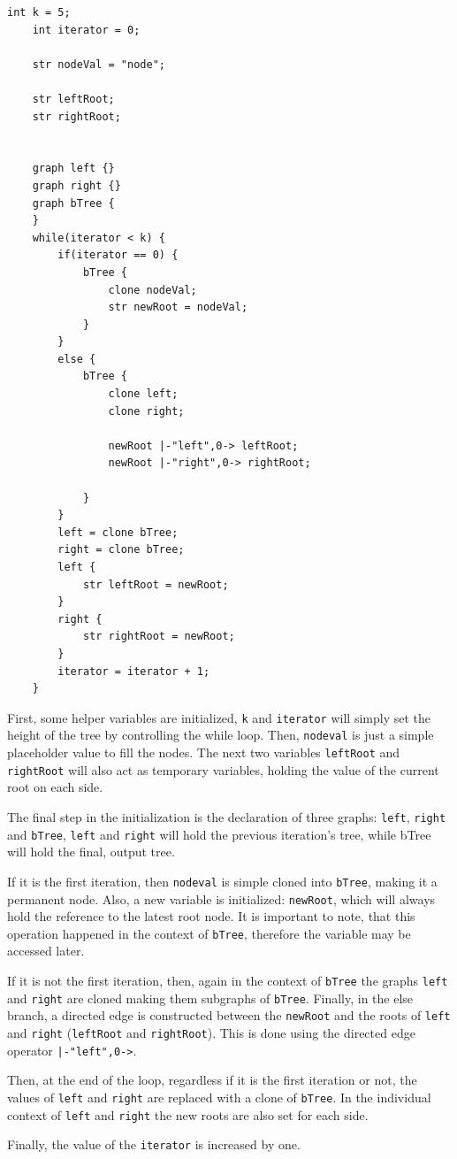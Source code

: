 \begin{lstlisting}[caption={Lattice code generating a balanced binary tree of height K.},captionpos=b,label={lst:syntax_k_sized_tree}]
    int k = 5;
    int iterator = 0;

    str nodeVal = "node";

    str leftRoot;
    str rightRoot;


    graph left {}
    graph right {}
    graph bTree {
    }
    while(iterator < k) {
        if(iterator == 0) {
            bTree {
                clone nodeVal;
                str newRoot = nodeVal;
            }
        }
        else {
            bTree {
                clone left;
                clone right;

                newRoot |-"left",0-> leftRoot;
                newRoot |-"right",0-> rightRoot;

            }
        }
        left = clone bTree;
        right = clone bTree;
        left {
            str leftRoot = newRoot;
        }
        right {
            str rightRoot = newRoot;
        }
        iterator = iterator + 1;
    }
\end{lstlisting}

First, some helper variables are initialized, \lstinline{k} and \lstinline{iterator} will simply set the height of
the tree by controlling the while loop.
Then, \lstinline{nodeval} is just a simple placeholder value to fill the nodes.
The next two variables \lstinline{leftRoot} and \lstinline{rightRoot} will also act as temporary variables,
holding the value of the current root on each side.

The final step in the initialization is the declaration of three graphs: \lstinline{left}, \lstinline{right} and
\lstinline{bTree}, \lstinline{left} and \lstinline{right} will hold the previous iteration's tree, while bTree will hold
the final, output tree.

If it is the first iteration, then \lstinline{nodeval} is simple cloned into \lstinline{bTree}, making it a permanent node.
Also, a new variable is initialized: \lstinline{newRoot}, which will always hold the reference to the latest root node.
It is important to note, that this operation happened in the context of \lstinline{bTree}, therefore the variable may
be accessed later.

If it is not the first iteration, then, again in the context of \lstinline{bTree} the graphs \lstinline{left} and \lstinline{right}
are cloned making them subgraphs of \lstinline{bTree}.
Finally, in the else branch, a directed edge is constructed between the \lstinline{newRoot} and the roots of \lstinline{left} and \lstinline{right}
(\lstinline{leftRoot} and \lstinline{rightRoot}).
This is done using the directed edge operator \lstinline{|-"left",0->}.

Then, at the end of the loop, regardless if it is the first iteration or not, the values of \lstinline{left} and \lstinline{right}
are replaced with a clone of \lstinline{bTree}.
In the individual context of \lstinline{left} and \lstinline{right} the new roots are also set for each side.

Finally, the value of the \lstinline{iterator} is increased by one.




